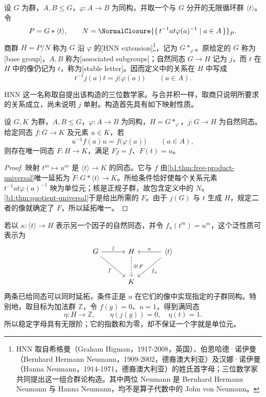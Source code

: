 \begin{definition}\label{b1:def:hnn-extension}
	设 \(G\) 为群，\(A,B\le G\)，\(\varphi:A\rightarrow B\) 为同构，并取一个与 \(G\) 分开的无限循环群 \(\langle t\rangle\)。令
	\[
		P=G*\langle t\rangle,\qquad
		N=\NormalClosure{\{\,t^{-1}at\varphi(a)^{-1}\mid a\in A\,\}}_{P}.
	\]
	商群 \(H=P/N\) 称为 \(G\) 沿 \(\varphi\) 的[HNN extension]\footnote{HNN 取自希格曼（Graham Higman，1917-2008，英国）、伯恩哈德·诺伊曼（Bernhard Hermann Neumann，1909-2002，德裔澳大利亚）及汉娜·诺伊曼（Hanna Neumann，1914-1971，德裔澳大利亚）的姓氏首字母；三位数学家共同提出这一组合群论构造。其中两位 Neumann 是 Bernhard Hermann Neumann 与 Hanna Neumann，均不是算子代数中的 John von Neumann。}，记为 \(G*_{\varphi}\)。原给定的 \(G\) 称为[base group]，\(A,B\) 称为[associated subgroups]；自然同态 \(G\rightarrow H\) 记为 \(j\)，而 \(t\) 在 \(H\) 中的像仍记为 \(t\)，称为[stable letter]。因而定义中的关系在 \(H\) 中写成
	\[
		t^{-1}j(a)t=j\bigl(\varphi(a)\bigr)\qquad(a\in A).
	\]
\end{definition}

HNN 这一名称取自提出该构造的三位数学家。与合并积一样，取商只说明所要求的关系成立，尚未说明 \(j\) 单射。构造首先具有如下映射性质。

\begin{proposition}\label{b1:prop:hnn-universal}
	设 \(G,K\) 为群，\(A,B\le G\)，\(\varphi:A\rightarrow B\) 为同构，\(H=G*_{\varphi}\)，\(j:G\rightarrow H\) 为自然同态。给定同态 \(f:G\rightarrow K\) 及元素 \(u\in K\)，若
	\[
		u^{-1}f(a)u=f\bigl(\varphi(a)\bigr)\qquad(a\in A),
	\]
	则存在唯一同态 \(F:H\rightarrow K\)，满足 \(Fj=f\)、\(F(t)=u\)。
\end{proposition}
\begin{proof}
	映射 \(t^m\mapsto u^m\) 是 \(\langle t\rangle\rightarrow K\) 的同态。它与 \(f\) 由\cref{b1:thm:free-product-universal}唯一延拓为 \(\widetilde F:G*\langle t\rangle\rightarrow K\)。所给条件恰好使每个关系元素 \(t^{-1}at\varphi(a)^{-1}\) 映为单位元；核是正规子群，故包含定义中的 \(N\)。\cref{b1:thm:quotient-universal}于是给出所需的 \(F\)。由于 \(j(G)\) 与 \(t\) 生成 \(H\)，规定二者的像就确定了 \(F\)，所以延拓唯一。
\end{proof}

若以 \(\kappa:\langle t\rangle\rightarrow H\) 表示另一个因子的自然同态，并令 \(f_u(t^m)=u^m\)，这个泛性质可表示为
\[
	\begin{tikzcd}[column sep=3.3em,row sep=2.6em]
		G\arrow[r,"j"]\arrow[dr,"f"']&H\arrow[d,dashed,"\exists!\,F"]&
		\langle t\rangle\arrow[l,"\kappa"']\arrow[dl,"f_u"]\\
		&K&
	\end{tikzcd}
\]
两条已给同态可以同时延拓，条件正是 \(u\) 在它们的像中实现指定的子群同构。特别地，取目标为加法群 \(\mathbb Z\)，令 \(f(g)=0\)、\(u=1\)，得到满同态
\[
	\eta:H\longrightarrow\mathbb Z,\qquad \eta(j(g))=0,\quad\eta(t)=1.
\]
所以稳定字母具有无限阶；它的指数和为零，却不保证一个字就是单位元。

